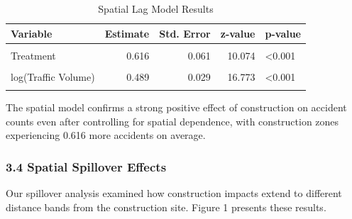 \documentclass[
]{article}
\begin{document}
\begin{longtable}[t]{lrrrl}
\caption{\label{tab:spatial_model_table}Spatial Lag Model Results}\\
\toprule
\textbf{Variable} & \textbf{Estimate} & \textbf{Std. Error} & \textbf{z-value} & \textbf{p-value}\\
\midrule
\cellcolor{gray!10}{Intercept} & \cellcolor{gray!10}{-4.260} & \cellcolor{gray!10}{0.247} & \cellcolor{gray!10}{-17.255} & \cellcolor{gray!10}{<0.001}\\
Treatment & 0.616 & 0.061 & 10.074 & <0.001\\
\cellcolor{gray!10}{Urban} & \cellcolor{gray!10}{-0.523} & \cellcolor{gray!10}{0.111} & \cellcolor{gray!10}{-4.697} & \cellcolor{gray!10}{<0.001}\\
log(Traffic Volume) & 0.489 & 0.029 & 16.773 & <0.001\\
\cellcolor{gray!10}{Spatial Lag (ρ)} & \cellcolor{gray!10}{0.770} & \cellcolor{gray!10}{0.006} & \cellcolor{gray!10}{130.010} & \cellcolor{gray!10}{<0.001}\\
\bottomrule
\end{longtable}

The spatial model confirms a strong positive effect of construction on
accident counts even after controlling for spatial dependence, with
construction zones experiencing 0.616 more accidents on average.

\subsubsection{3.4 Spatial Spillover
Effects}\label{spatial-spillover-effects}

Our spillover analysis examined how construction impacts extend to
different distance bands from the construction site. Figure 1 presents
these results.
\end{document}

